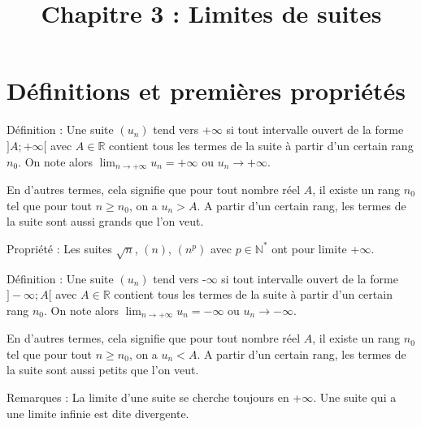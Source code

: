 \documentclass[11pt,a4paper]{article}
\begin{document}
\title{\textbf{Chapitre 3 : Limites de suites }}
\date{}
\maketitle

\section{Définitions et premières propriétés}

\begin{boiteDef}{Définition :}
    Une suite $(u_n)$ tend vers +$\infty$ si tout intervalle ouvert de la forme $]A; +\infty[$ avec $A \in \mathbb{R}$ contient tous les termes de la suite à partir d'un certain rang $n_0$.
    \newline
    On note alors $\displaystyle \lim_{n \to +\infty} u_n = +\infty$ ou $u_n \to +\infty$.
\end{boiteDef}

\begin{flushleft}
    En d'autres termes, cela signifie que pour tout nombre réel $A$, il existe un rang $n_0$ tel que pour tout $n \geq n_0$, on a $u_n > A$.
    A partir d'un certain rang, les termes de la suite sont aussi grands que l'on veut.
\end{flushleft}

\begin{boiteProp}{Propriété :}
    Les suites ${\sqrt{n}}$, $(n)$, $(n^p)$ avec $p \in \mathbb{N}^*$ ont pour limite +$\infty$.
\end{boiteProp}

\begin{boiteDef}{Définition :}
    Une suite $(u_n)$ tend vers -$\infty$ si tout intervalle ouvert de la forme $]-\infty; A[$ avec $A \in \mathbb{R}$ contient tous les termes de la suite à partir d'un certain rang $n_0$.
    \newline
    On note alors $\displaystyle \lim_{n \to +\infty} u_n = -\infty$ ou $u_n \to -\infty$.
\end{boiteDef}

\begin{flushleft}
    En d'autres termes, cela signifie que pour tout nombre réel $A$, il existe un rang $n_0$ tel que pour tout $n \geq n_0$, on a $u_n < A$.
    A partir d'un certain rang, les termes de la suite sont aussi petits que l'on veut.
\end{flushleft}

\begin{boiteRemarque}{Remarques :}
    La limite d'une suite se cherche toujours en +$\infty$.
    \newline
    Une suite qui a une limite infinie est dite divergente.
\end{boiteRemarque}
\end{document}
